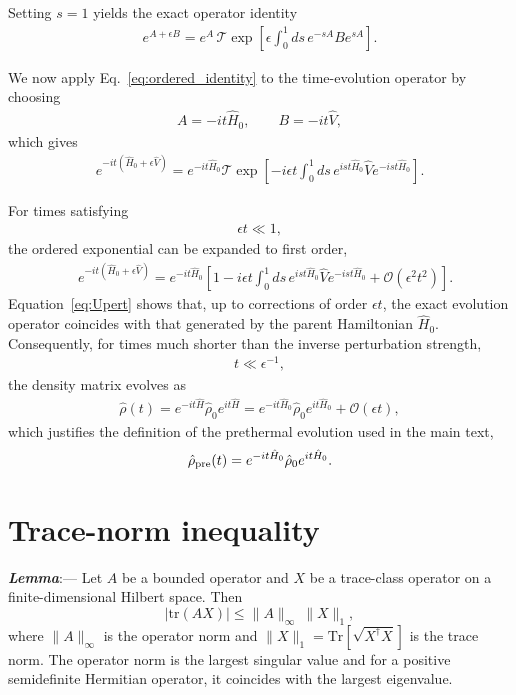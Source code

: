 \documentclass[aps,prl,amsfonts,floatfix,superscriptaddress,longbibliography,twocolumn,footinbib]{revtex4-2}
\begin{document}
Setting $s=1$ yields the exact operator identity
%
\begin{align}
e^{A+\epsilon B}
=
e^A
\,
\mathcal T
\exp\!\left[
\epsilon
\int_0^1
ds\,
e^{-sA}
Be^{sA}
\right].
\label{eq:ordered_identity}
\end{align}

We now apply Eq.~\eqref{eq:ordered_identity} to the time-evolution operator by choosing
%
\begin{align}
A=-it\hat H_0,
\qquad
B=-it\hat V,
\end{align}
%
which gives
%
\begin{align}
e^{-it(\hat H_0+\epsilon\hat V)}
=
e^{-it\hat H_0}
\mathcal T
\exp\!\left[
-i\epsilon t
\int_0^1
ds\,
e^{is t\hat H_0}
\hat V
e^{-is t\hat H_0}
\right].
\label{eq:Uexact}
\end{align}

For times satisfying
%
\begin{align}
\epsilon t\ll1,
\end{align}
%
the ordered exponential can be expanded to first order,
%
\begin{align}
& e^{-it(\hat H_0+\epsilon\hat V)} =
e^{-it\hat H_0}
\left[
1
-
i\epsilon t
\int_0^1
ds\,
e^{is t\hat H_0}
\hat V
e^{-is t\hat H_0}
+
\mathcal O(\epsilon^2t^2)
\right].
\label{eq:Upert}
\end{align}
Equation~\eqref{eq:Upert} shows that, up to corrections of order $\epsilon t$, the exact evolution operator coincides with that generated by the parent Hamiltonian $\hat H_0$. Consequently, for times much shorter than the inverse perturbation strength,
%
\begin{align}
t\ll\epsilon^{-1},
\end{align}
%
the density matrix evolves as
%
\begin{align}
\hat\rho(t)
=
e^{-it\hat H}\hat\rho_0e^{it\hat H}
=
e^{-it\hat H_0}
\hat\rho_0
e^{it\hat H_0}
+
\mathcal O(\epsilon t),
\end{align}
%
which justifies the definition of the prethermal evolution used in the main text,
%
\begin{align}
\hat\rho_{\rm pre}(t)
=
e^{-it\hat H_0}
\hat\rho_0
e^{it\hat H_0}.
\end{align}


\section{Trace-norm inequality} \label{APP:Trace-Norm}
\textit{\textbf{Lemma}}:---
Let $A$ be a bounded operator and $X$ be a trace-class operator on a finite-dimensional Hilbert space. Then
\begin{equation}
|\mathrm{tr}(A X)| \le \|A\|_{\infty} ~ \|X\|_1,
\end{equation}
where $\|A\|_{\infty}$ is the operator norm and $\|X\|_1 = \text{Tr}[\sqrt{X^\dagger X}]$ is the trace norm. The operator norm is the largest singular value and for a positive semidefinite Hermitian operator, it coincides with the largest eigenvalue.
\end{document}
